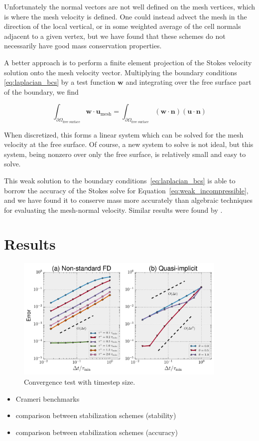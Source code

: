 \documentclass[preprint,12pt,authoryear]{elsarticle}
\begin{document}
Unfortunately the normal vectors are not well defined on the mesh vertices, which is 
where the mesh velocity is defined. One could instead advect the mesh in the direction 
of the local vertical, or in some weighted average of the cell normals adjacent to a given vertex,
but we have found that these schemes do not necessarily have good mass conservation 
properties.

A better approach is to perform a finite element projection of the Stokes velocity 
solution onto the mesh velocity vector. Multiplying the boundary conditions 
\eqref{eq:laplacian_bcs} by a test function $\mathbf{w}$ and integrating over the free
surface part of the boundary, we find

\begin{equation}
\int_{\partial \Omega_{\textrm{free surface}} } \mathbf{w} \cdot \mathbf{u}_\mathrm{mesh} = 
\int_{\partial \Omega_{\textrm{free surface}} } \left( \mathbf{w \cdot n } \right) \left( \mathbf{u \cdot n} \right)
\end{equation}

When discretized, this forms a linear system which can be solved for the mesh velocity at the 
free surface. Of course, a new system to solve is not ideal, but this system, being nonzero 
over only the free surface, is relatively small and easy to solve.

This weak solution to the boundary conditions~\eqref{eq:laplacian_bcs} is able to borrow
the accuracy of the Stokes solve for Equation~\eqref{eq:weak_incompressible}, and we have 
found it to conserve mass more accurately than algebraic techniques for evaluating the mesh-normal velocity.
Similar results were found by \citet{fullsack1995arbitrary}.

\section{Results}
\begin{figure}
\includegraphics[width=0.9\textwidth]{figures/timestep_convergence.pdf}
\caption{Convergence test with timestep size.}
\label{fig:timestep_convergence}
\end{figure}
\begin{itemize}
\item Crameri benchmarks
\item comparison between stabilization schemes (stability)
\item comparison between stabilization schemes (accuracy)
\end{itemize}
\end{document}
